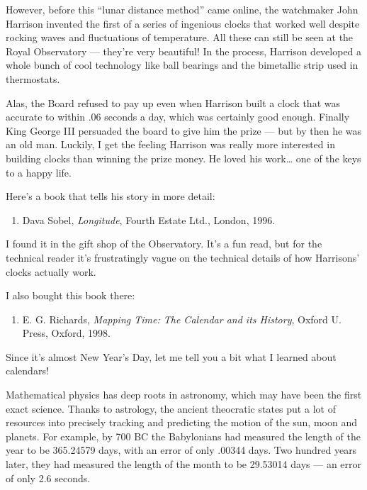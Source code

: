 \documentclass{article}
\def\tightlist{}
\begin{document}
However, before this ``lunar distance method'' came online, the
watchmaker John Harrison invented the first of a series of ingenious
clocks that worked well despite rocking waves and fluctuations of
temperature. All these can still be seen at the Royal Observatory ---
they're very beautiful! In the process, Harrison developed a whole bunch
of cool technology like ball bearings and the bimetallic strip used in
thermostats.

Alas, the Board refused to pay up even when Harrison built a clock that
was accurate to within .06 seconds a day, which was certainly good
enough. Finally King George III persuaded the board to give him the
prize --- but by then he was an old man. Luckily, I get the feeling
Harrison was really more interested in building clocks than winning the
prize money. He loved his work\ldots{} one of the keys to a happy life.

Here's a book that tells his story in more detail:

\begin{enumerate}
\def\labelenumi{\arabic{enumi})}
\tightlist
\item
  Dava Sobel, \emph{Longitude}, Fourth Estate Ltd., London, 1996.
\end{enumerate}

I found it in the gift shop of the Observatory. It's a fun read, but for
the technical reader it's frustratingly vague on the technical details
of how Harrisons' clocks actually work.

I also bought this book there:

\begin{enumerate}
\def\labelenumi{\arabic{enumi})}
\setcounter{enumi}{1}
\tightlist
\item
  E. G. Richards, \emph{Mapping Time: The Calendar and its History},
  Oxford U. Press, Oxford, 1998.
\end{enumerate}

Since it's almost New Year's Day, let me tell you a bit what I learned
about calendars!

Mathematical physics has deep roots in astronomy, which may have been
the first exact science. Thanks to astrology, the ancient theocratic
states put a lot of resources into precisely tracking and predicting the
motion of the sun, moon and planets. For example, by 700 BC the
Babylonians had measured the length of the year to be 365.24579 days,
with an error of only .00344 days. Two hundred years later, they had
measured the length of the month to be 29.53014 days --- an error of
only 2.6 seconds.
\end{document}
